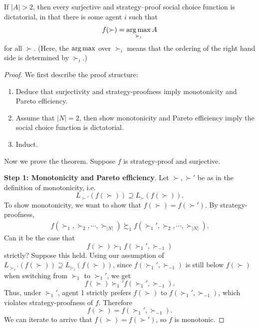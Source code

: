 \begin{theorem} \label{thm:gs}
	If $\left| A \right| > 2$, then every surjective and strategy--proof social choice function is dictatorial, in that there is some agent $i$ such that \[
		f(\succ) = \operatorname*{arg\,max}_{\succ_i}A
	\] for all $\succ$. (Here, the $\operatorname*{arg\,max}$ over $\succ_i$ means that the ordering of the right hand side is determined by $\succ_i$.)
\end{theorem}

\begin{proof}
	We first describe the proof structure:
	\begin{enumerate}[label = (\roman*)]
		\item Deduce that surjectivity and strategy-proofness imply monotonicity and Pareto efficiency.
		\item Assume that $\left| N \right| = 2$, then show monotonicity and Pareto efficiency imply the social choice function is dictatorial.
		\item Induct.
	\end{enumerate}

	Now we prove the theorem.
	Suppose $f$ is strategy-proof and surjective. 

	\textbf{Step 1: Monotonicity and Pareto efficiency}. Let $\succ,\succ'$ be as in the definition of monotonicity, i.e. \[
		L_{\succ'}(f(\succ)) \supseteq L_{\succ} \left( f(\succ) \right)
	.\] To show monotonicity, we want to show that $f(\succ) = f(\succ')$.
	By strategy-proofness, 
	\begin{align*}
		f\left( \succ_1, \succ_2, \cdots, \succ_{\left| N \right|} \right) \succsim_1 f\left( \succ_1', \succ_2, \cdots, \succ_{\left| N \right|} \right)
	.\end{align*}
	Can it be the case that \[
		f\left( \succ \right) \succ_1 f\left( \succ_1', \succ_{-1} \right)
	\] strictly? Suppose this held. Using our assumption of $L_{\succ_i'}\left( f(\succ) \right) \supseteq L_{\succ_i}\left( f(\succ) \right)$, since $f(\succ_1',\succ_{-1})$ is still below $f(\succ)$ when switching from $\succ_1$ to $\succ_1'$, we get \[
		f\left( \succ  \right)\succ_1' f(\succ_1', \succ_{-1})
	.\]
	Thus, under $\succ_1'$, agent 1 strictly prefers $f(\succ)$ to $f(\succ_1', \succ_{-1})$, which violates strategy-proofness of $f$. Therefore \[
		f\left( \succ  \right) = f\left( \succ_1', \succ_{-1} \right)
	.\] We can iterate to arrive that $f(\succ) = f(\succ')$, so $f$ is monotonic.


\end{proof}
